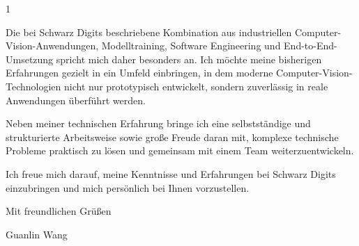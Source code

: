 \documentclass[10pt,a4paper,withhyper]{../altacv}
\begin{document}
\begin{paracol}{1}
    \vspace{2em}

    Die bei Schwarz Digits beschriebene Kombination aus industriellen Computer-Vision-Anwendungen, Modelltraining, Software Engineering und End-to-End-Umsetzung spricht mich daher besonders an. Ich möchte meine bisherigen Erfahrungen gezielt in ein Umfeld einbringen, in dem moderne Computer-Vision-Technologien nicht nur prototypisch entwickelt, sondern zuverlässig in reale Anwendungen überführt werden.

    \vspace{2em}

    Neben meiner technischen Erfahrung bringe ich eine selbstständige und strukturierte Arbeitsweise sowie große Freude daran mit, komplexe technische Probleme praktisch zu lösen und gemeinsam mit einem Team weiterzuentwickeln.

    \vspace{2em}

    Ich freue mich darauf, meine Kenntnisse und Erfahrungen bei Schwarz Digits einzubringen und mich persönlich bei Ihnen vorzustellen.

    \vspace{5em}

    Mit freundlichen Grüßen

    \vspace{1em}

    Guanlin Wang




    \medskip


\end{paracol}
\end{document}
